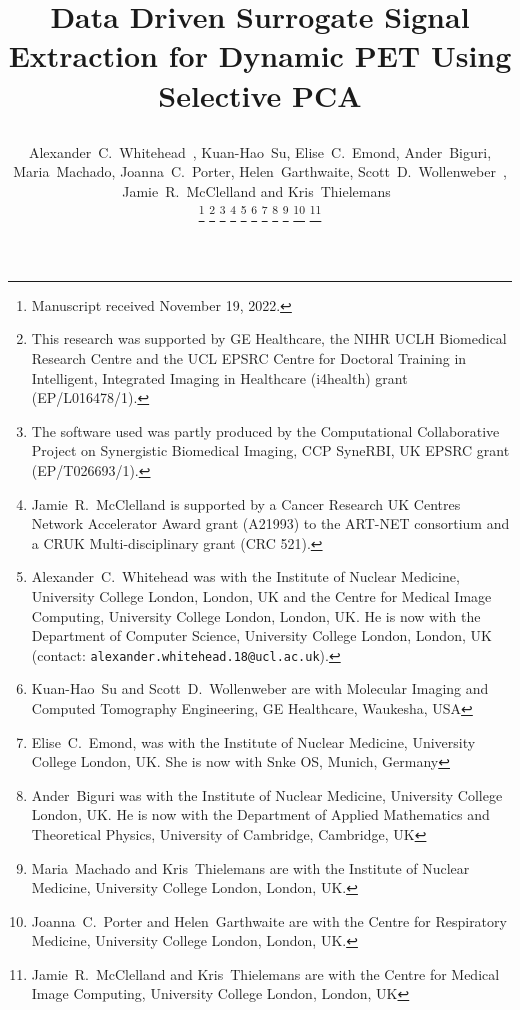 \documentclass[10pt, twocolumn, twoside, letterpaper]{IEEEtran}
\begin{document}
\title{

    Data Driven Surrogate Signal Extraction for Dynamic PET Using Selective PCA
}

\pagestyle{plain}

\author{

    Alexander~C.~Whitehead~,
    Kuan-Hao~Su,
    Elise~C.~Emond,
    Ander~Biguri,
    Maria~Machado,
    Joanna~C.~Porter,
    Helen~Garthwaite,
    Scott~D.~Wollenweber~,
    Jamie~R.~McClelland and
    Kris~Thielemans~

    \thanks{Manuscript received November 19, 2022.}
    \thanks{This research was supported by GE Healthcare, the NIHR UCLH Biomedical Research Centre and the UCL EPSRC Centre for Doctoral Training in Intelligent, Integrated Imaging in Healthcare (i4health) grant (EP/L016478/1).}
    \thanks{The software used was partly produced by the Computational Collaborative Project on Synergistic Biomedical Imaging, CCP SyneRBI, UK EPSRC grant (EP/T026693/1).}
    \thanks{Jamie~R.~McClelland is supported by a Cancer Research UK Centres Network Accelerator Award grant (A21993) to the ART-NET consortium and a CRUK Multi-disciplinary grant (CRC 521).}
    \thanks{Alexander~C.~Whitehead was with the Institute of Nuclear Medicine, University College London, London, UK and the Centre for Medical Image Computing, University College London, London, UK. He is now with the Department of Computer Science, University College London, London, UK (contact: \texttt{alexander.whitehead.18@ucl.ac.uk}).}
    \thanks{Kuan-Hao~Su and Scott~D.~Wollenweber are with Molecular Imaging and Computed Tomography Engineering, GE Healthcare, Waukesha, USA}
    \thanks{Elise~C.~Emond, was with the Institute of Nuclear Medicine, University College London, UK. She is now with Snke OS, Munich, Germany}
    \thanks{Ander~Biguri was with the Institute of Nuclear Medicine, University College London, UK. He is now with the Department of Applied Mathematics and Theoretical Physics, University of Cambridge, Cambridge, UK}
    \thanks{Maria~Machado and Kris~Thielemans are with the Institute of Nuclear Medicine, University College London, London, UK.}
    \thanks{Joanna~C.~Porter and Helen~Garthwaite are with the Centre for Respiratory Medicine, University College London, London, UK.}
    \thanks{Jamie~R.~McClelland and Kris~Thielemans are with the Centre for Medical Image Computing, University College London, London, UK}
}
\end{document}
